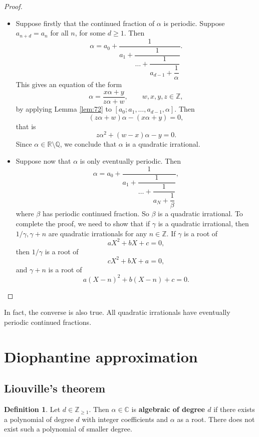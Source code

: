 \documentclass{article}
\newcommand{\Z}{\mathbb{Z}}
\newcommand{\Q}{\mathbb{Q}}
\newcommand{\R}{\mathbb{R}}
\newcommand{\C}{\mathbb{C}}
\newcommand{\rb}[1]{\left( #1 \right)}
\renewcommand{\sb}[1]{\left[ #1 \right]}
\theoremstyle{definition}\newtheorem{definition}{Definition}
\theoremstyle{definition}\newtheorem{remark}[definition]{Remark}
\theoremstyle{definition}\newtheorem*{example}{Example}
\theoremstyle{definition}\newtheorem*{note}{Note}
\begin{document}
\begin{proof}
\hfill
\begin{itemize}
\item Suppose firstly that the continued fraction of $ \alpha $ is periodic. Suppose $ a_{n + d} = a_n $ for all $ n $, for some $ d \ge 1 $. Then
$$ \alpha = a_0 + \dfrac{1}{a_1 + \dfrac{1}{\dots + \dfrac{1}{a_{d - 1} + \dfrac{1}{\alpha}}}}. $$
This gives an equation of the form
$$ \alpha = \dfrac{x\alpha + y}{z\alpha + w}, \qquad w, x, y, z \in \Z, $$
by applying Lemma \ref{lem:72} to $ \sb{a_0; a_1, \dots, a_{d - 1}, \alpha} $. Then
$$ \rb{z\alpha + w}\alpha - \rb{x\alpha + y} = 0, $$
that is
$$ z\alpha^2 + \rb{w - x}\alpha - y = 0. $$
Since $ \alpha \in \R \setminus \Q $, we conclude that $ \alpha $ is a quadratic irrational.
\item Suppose now that $ \alpha $ is only eventually periodic. Then
$$ \alpha = a_0 + \dfrac{1}{a_1 + \dfrac{1}{\dots + \dfrac{1}{a_N + \dfrac{1}{\beta}}}}, $$
where $ \beta $ has periodic continued fraction. So $ \beta $ is a quadratic irrational. To complete the proof, we need to show that if $ \gamma $ is a quadratic irrational, then $ 1 / \gamma, \gamma + n $ are quadratic irrationals for any $ n \in \Z $. If $ \gamma $ is a root of
$$ aX^2 + bX + c = 0, $$
then $ 1 / \gamma $ is a root of
$$ cX^2 + bX + a = 0, $$
and $ \gamma + n $ is a root of
$$ a\rb{X - n}^2 + b\rb{X - n} + c = 0. $$
\end{itemize}
\end{proof}

In fact, the converse is also true. All quadratic irrationals have eventually periodic continued fractions.

\pagebreak

\section{Diophantine approximation}

\subsection{Liouville's theorem}

\begin{definition}
Let $ d \in \Z_{\ge 1} $. Then $ \alpha \in \C $ is \textbf{algebraic of degree $ d $} if there exists a polynomial of degree $ d $ with integer coefficients and $ \alpha $ as a root. There does not exist such a polynomial of smaller degree.
\end{definition}
\end{document}
